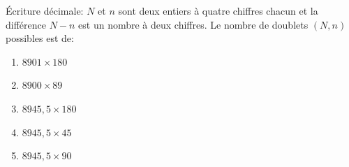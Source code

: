 % 
%
\label{1.1}%
Écriture décimale: $N$ et $n$ sont deux entiers à quatre chiffres chacun et la différence $N-n$ est un nombre à deux chiffres. 
Le nombre de doublets $(N, n)$ possibles est de:
%
\begin{enumerate}
  \item $8901 \times 180$
  \item $8900 \times 89$
  \item $8945,5 \times 180$
  \item $8945,5 \times 45$
  \item $8945,5 \times 90$
\end{enumerate}
%

